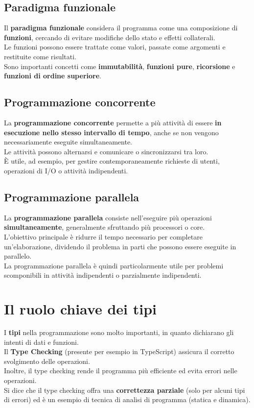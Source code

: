 \documentclass[12pt,a4paper]{article}
\let\oldsection\section
\renewcommand{\section}{\clearpage\oldsection}
\begin{document}
\subsection{Paradigma funzionale}
Il \textbf{paradigma funzionale} considera il programma come una composizione di \textbf{funzioni}, cercando di evitare modifiche dello stato e effetti collaterali.\\
Le funzioni possono essere trattate come valori, passate come argomenti e restituite come risultati.\\
Sono importanti concetti come \textbf{immutabilità}, \textbf{funzioni pure}, \textbf{ricorsione} e \textbf{funzioni di ordine superiore}.

\subsection{Programmazione concorrente}
La \textbf{programmazione concorrente} permette a più attività di essere \textbf{in esecuzione nello stesso intervallo di tempo}, anche se non vengono necessariamente eseguite simultaneamente.\\
Le attività possono alternarsi e comunicare o sincronizzarsi tra loro.\\
È utile, ad esempio, per gestire contemporaneamente richieste di utenti, operazioni di I/O o attività indipendenti.

\subsection{Programmazione parallela}
La \textbf{programmazione parallela} consiste nell'eseguire più operazioni \textbf{simultaneamente}, generalmente sfruttando più processori o core.\\
L'obiettivo principale è ridurre il tempo necessario per completare un'elaborazione, dividendo il problema in parti che possono essere eseguite in parallelo.\\
La programmazione parallela è quindi particolarmente utile per problemi scomponibili in attività indipendenti o parzialmente indipendenti.

\section{Il ruolo chiave dei tipi}
I \textbf{tipi} nella programmazione sono molto importanti, in quanto dichiarano gli intenti di dati e funzioni.\\
Il \textbf{Type Checking} (presente per esempio in TypeScript) assicura il corretto svolgimento delle operazioni.\\
Inoltre, il type checking rende il programma più efficiente ed evita errori nelle operazioni.\\
Si dice che il type checking offra una \textbf{correttezza parziale} (solo per alcuni tipi di errori) ed è un esempio di tecnica di analisi di programma (statica e dinamica).
\end{document}
